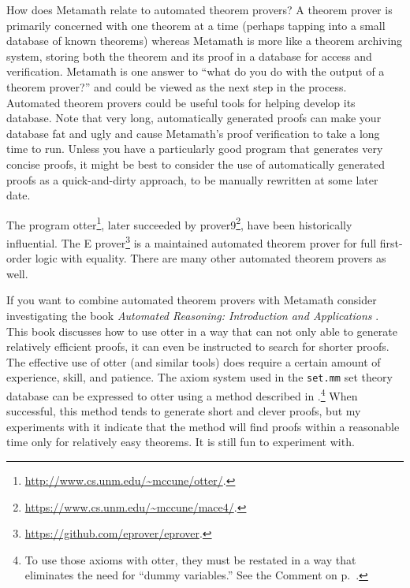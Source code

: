 How does Metamath relate to automated theorem provers?  A
theorem prover is primarily concerned with one theorem at a time (perhaps
tapping into a small database of known theorems) whereas Metamath is more like
a theorem archiving system, storing both the theorem and its proof in a
database for access and verification.  Metamath is one answer to ``what do you
do with the output of a theorem prover?''  and could be viewed as the
next step in the process.  Automated theorem provers could be useful tools for
helping develop its database.
Note that very long, automatically
generated proofs can make your database fat and ugly and cause Metamath's proof
verification to take a long time to run.  Unless you have a particularly good
program that generates very concise proofs, it might be best to consider the
use of automatically generated proofs as a quick-and-dirty approach, to be
manually rewritten at some later date.

The program {\sc otter}\footnote{\url{http://www.cs.unm.edu/\~mccune/otter/}.}, later succeeded by
prover9\footnote{\url{https://www.cs.unm.edu/~mccune/mace4/}.},
have been historically influential.
The E prover\footnote{\url{https://github.com/eprover/eprover}.}
is a maintained automated theorem prover
for full first-order logic with equality.
There are many other automated theorem provers as well.

If you want to combine automated theorem provers with Metamath
consider investigating
the book {\em Automated Reasoning:  Introduction and Applications}
\cite{Wos}.  This book discusses
how to use {\sc otter} in a way that can
not only able to generate
relatively efficient proofs, it can even be instructed to search for
shorter proofs.  The effective use of {\sc otter} (and similar tools)
does require a certain
amount of experience, skill, and patience.  The axiom system used in the
\texttt{set.mm} set theory
database can be expressed to {\sc otter} using a method described in
\cite{Megill}.\footnote{To use those axioms with
{\sc otter}, they must be restated in a way that eliminates the need for
``dummy variables.'' See the Comment
on p.~\pageref{nodd}.} When successful, this method tends to generate
short and clever proofs, but my experiments with it indicate that the
method will find proofs within a reasonable time only for relatively
easy theorems.  It is still fun to experiment with.

